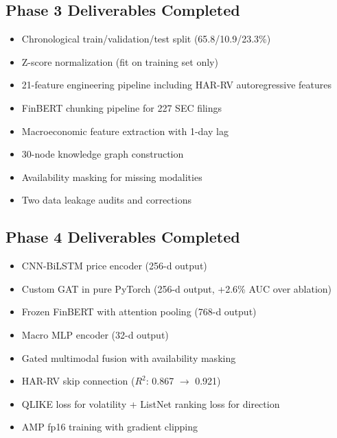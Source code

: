 \subsection{Phase 3 Deliverables Completed}
\begin{itemize}[noitemsep]
    \item[$\checkmark$] Chronological train/validation/test split (65.8/10.9/23.3\%)
    \item[$\checkmark$] Z-score normalization (fit on training set only)
    \item[$\checkmark$] 21-feature engineering pipeline including HAR-RV autoregressive features
    \item[$\checkmark$] FinBERT chunking pipeline for 227 SEC filings
    \item[$\checkmark$] Macroeconomic feature extraction with 1-day lag
    \item[$\checkmark$] 30-node knowledge graph construction
    \item[$\checkmark$] Availability masking for missing modalities
    \item[$\checkmark$] Two data leakage audits and corrections
\end{itemize}

\subsection{Phase 4 Deliverables Completed}
\begin{itemize}[noitemsep]
    \item[$\checkmark$] CNN-BiLSTM price encoder (256-d output)
    \item[$\checkmark$] Custom GAT in pure PyTorch (256-d output, +2.6\% AUC over ablation)
    \item[$\checkmark$] Frozen FinBERT with attention pooling (768-d output)
    \item[$\checkmark$] Macro MLP encoder (32-d output)
    \item[$\checkmark$] Gated multimodal fusion with availability masking
    \item[$\checkmark$] HAR-RV skip connection ($R^2$: 0.867 $\to$ 0.921)
    \item[$\checkmark$] QLIKE loss for volatility + ListNet ranking loss for direction
    \item[$\checkmark$] AMP fp16 training with gradient clipping
\end{itemize}

